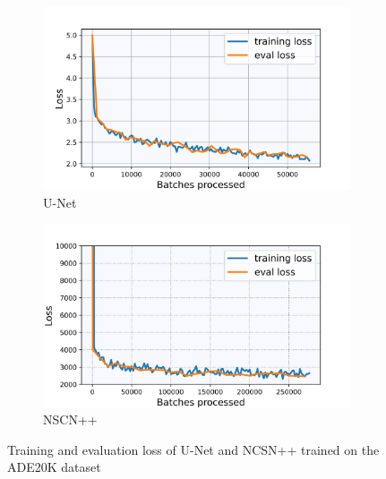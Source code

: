 %
\begin{figure}[] \label{fig:5.18}
    \centering
    \begin{subfigure}[b]{0.49\textwidth}
        \includegraphics[width=\textwidth]{Chapters/figures/experiments/ade/loss_ade_seg.jpg}
        \caption{U-Net}
    \end{subfigure}
    \begin{subfigure}[b]{0.49\textwidth}
        \includegraphics[width=\textwidth]{Chapters/figures/experiments/ade/loss_ade_ncsn.jpg}
        \caption{NSCN++}
    \end{subfigure}
    \caption[Losses of U-Net/NCSN++ on ADE20K dataset]{Training and evaluation loss of U-Net and NCSN++ trained on the ADE20K dataset}
\end{figure}
%
